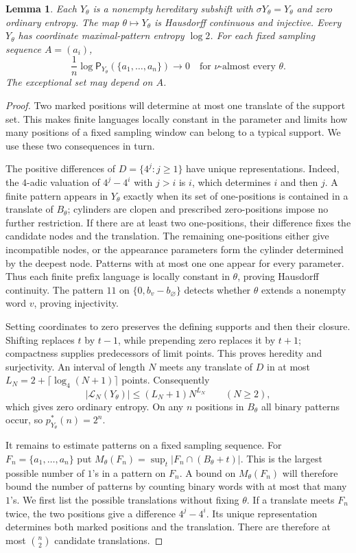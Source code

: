 \documentclass[11pt,reqno]{amsart}
\numberwithin{equation}{section}
\newtheorem{lemma}[theorem]{Lemma}
\theoremstyle{definition}
\theoremstyle{definition}
\newcommand{\Patt}{\mathsf P}
\begin{document}
\begin{lemma}\label{lem:sparse-bundle}
Each $Y_\theta$ is a nonempty hereditary subshift with
$\sigma Y_\theta=Y_\theta$ and zero ordinary entropy.
The map $\theta\mapsto Y_\theta$ is Hausdorff continuous and injective.
Every $Y_\theta$ has coordinate maximal-pattern entropy $\log2$.
For each fixed sampling sequence $A=(a_i)$,
\[
 \frac1n\log\Patt_{Y_\theta}(\{a_1,\ldots,a_n\})
 \longrightarrow0
 \quad\text{for }\nu\text{-almost every }\theta.
\]
The exceptional set may depend on $A$.
\end{lemma}
\begin{proof}
Two marked positions will determine at most one translate of the
support set. This makes finite languages locally constant in the
parameter and limits how many positions of a fixed sampling window
can belong to a typical support. We use these two consequences in
turn.

The positive differences of $D=\{4^j:j\ge1\}$ have unique
representations. Indeed, the $4$-adic valuation of
$4^j-4^i$ with $j>i$ is $i$, which determines $i$ and then $j$.
A finite pattern appears in $Y_\theta$ exactly when its set of
one-positions is contained in a translate of $B_\theta$;
cylinders are clopen and prescribed zero-positions impose no
further restriction. If there are at least two one-positions,
their difference fixes the candidate nodes and the translation.
The remaining one-positions either give incompatible nodes, or
the appearance parameters form the cylinder determined by the
deepest node. Patterns with at most one one appear for every
parameter. Thus each finite prefix language is locally constant
in $\theta$, proving Hausdorff continuity. The pattern $11$ on
$\{0,b_v-b_\varnothing\}$ detects whether $\theta$ extends a
nonempty word $v$, proving injectivity.

Setting coordinates to zero preserves the defining supports and
then their closure. Shifting replaces $t$ by $t-1$, while
prepending zero replaces it by $t+1$; compactness supplies
predecessors of limit points. This proves heredity and surjectivity.
An interval of length $N$ meets any translate of $D$ in at most
$L_N=2+\lceil\log_4(N+1)\rceil$ points. Consequently
\[
 |\mathcal L_N(Y_\theta)|
 \le (L_N+1)N^{L_N}\qquad(N\ge2),
\]
which gives zero ordinary entropy. On any $n$ positions in
$B_\theta$ all binary patterns occur, so $p_{Y_\theta}^*(n)=2^n$.

It remains to estimate patterns on a fixed sampling sequence.
For $F_n=\{a_1,\ldots,a_n\}$ put
$M_\theta(F_n)=\sup_t|F_n\cap(B_\theta+t)|$.
This is the largest possible number of $1$'s in a pattern on $F_n$.
A bound on $M_\theta(F_n)$ will therefore bound the number of
patterns by counting binary words with at most that many $1$'s.
We first list the possible translations without fixing $\theta$. If a translate meets $F_n$ twice, the two positions
give a difference $4^j-4^i$. Its unique representation determines
both marked positions and the translation. There are therefore at
most $\binom n2$ candidate translations.


\end{proof}
\end{document}
